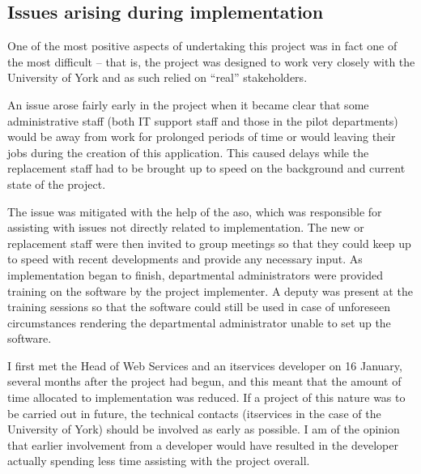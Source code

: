 
\subsection{Issues arising during implementation}
\label{sec:issuesarising}



One of the most positive aspects of undertaking this project was in fact one
of the most difficult -- that is, the project was designed to work very
closely with the University of York and as such relied on ``real''
stakeholders.

An issue arose fairly early in the project when it became clear that some
administrative staff (both IT support staff and those in the pilot
departments) would be away from work for prolonged periods of time or would
leaving their jobs during the creation of this application. This caused delays
while the replacement staff had to be brought up to speed on the background
and current state of the project.

The issue was mitigated with the help of the \gls{aso}, which was responsible
for assisting with issues not directly related to implementation. The new or
replacement staff were then invited to group meetings so that they could keep
up to speed with recent developments and provide any necessary input. As
implementation began to finish, departmental administrators were provided
training on the software by the project implementer. A deputy was present at
the training sessions so that the software could still be used in case of
unforeseen circumstances rendering the departmental administrator unable to
set up the software.


I first met the Head of Web Services and an \gls{itservices} developer on 16
January, several months after the project had begun, and this meant that the
amount of time allocated to implementation was reduced. If a project of this
nature was to be carried out in future, the technical contacts
(\gls{itservices} in the case of the University of York) should be involved as
early as possible. I am of the opinion that earlier involvement from a
developer would have resulted in the developer actually spending less time
assisting with the project overall.

